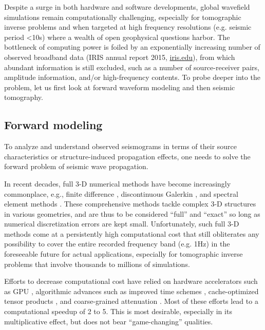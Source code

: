 \documentclass[extra,referee]{gji}
\begin{document}
Despite a surge in both hardware and software developments,
global wavefield simulations remain computationally challenging, 
especially for tomographic inverse problems and when targeted at high frequency resolutions 
(e.g. seismic period \textless 10s) where a wealth of open geophysical 
questions harbor. The bottleneck of computing power is foiled
by an exponentially increasing number of observed broadband data
(IRIS annual report 2015, \url{iris.edu}), from which abundant
information is still excluded, such as a number of source-receiver pairs,
amplitude information, and/or high-frequency contents.
To probe deeper into the problem, let us first look at 
forward waveform modeling and then seismic tomography.

\subsection{Forward modeling}
To analyze and understand observed seismograms in terms of their source
characteristics or structure-induced propagation effects, one needs to
solve the forward problem of seismic wave propagation.

In recent decades, full 3-D numerical methods have become increasingly
commonplace, e.g.,
finite difference \cite[]{igel2002wave}, 
discontinuous Galerkin \cite[]{dumbser2006arbitrary},
and spectral element methods \cite[]{komatitsch2002spectralI, 
komatitsch2002spectralII, chaljub2007spectral, peter2011forward}.
These comprehensive methods tackle complex 3-D structures in
various geometries, and are thus to be considered ``full'' and
``exact'' so long as numerical discretization errors are kept small. 
Unfortunately, such full 3-D methods come at a persistently high 
computational cost that still obliterates any possibility to 
cover the entire recorded frequency band (e.g. 1Hz) in the
foreseeable future for actual applications, 
especially for tomographic inverse problems that involve 
thousands to millions of simulations.

Efforts to decrease computational cost have relied on hardware 
accelerators such as GPU \cite[]{komatitsch2011fluid, rietmann2012forward},
algorithmic advances such as improved time schemes 
\cite[]{rietmann2015load, ma2014low, nissen2008sem}, 
cache-optimized tensor products \cite[Chap 8,][]{deville2002high,
nissen2007sem}, and coarse-grained attenuation \cite[]{van2014optimized}.
Most of these efforts lead to a computational speedup
of 2 to 5. This is most desirable, especially in its multiplicative effect,
but does not bear ``game-changing'' qualities.
\end{document}
